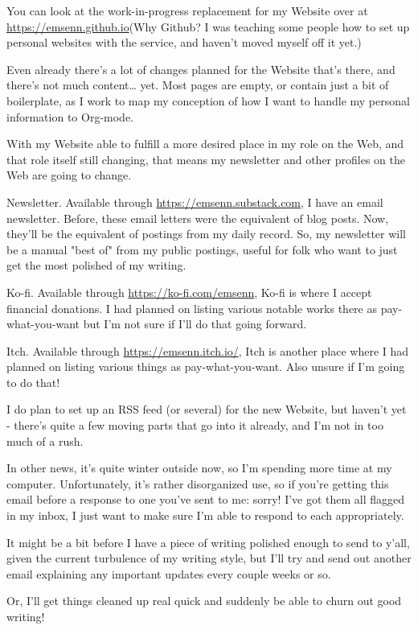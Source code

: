 \documentclass[11pt]{article}
\begin{document}
\begin{itemize}
You can look at the work-in-progress replacement for my Website over at \url{https://emsenn.github.io}(Why Github? I was teaching some people how to set up personal websites with the service, and haven't moved myself off it yet.)

Even already there's a lot of changes planned for the Website that's there, and there's not much content… yet. Most pages are empty, or contain just a bit of boilerplate, as I work to map my conception of how I want to handle my personal information to Org-mode.

With my Website able to fulfill a more desired place in my role on the Web, and that role itself still changing, that means my newsletter and other profiles on the Web are going to change.

Newsletter. Available through \url{https://emsenn.substack.com}, I have an email newsletter. Before, these email letters were the equivalent of blog posts. Now, they'll be the equivalent of postings from my daily record. So, my newsletter will be a manual "best of" from my public postings, useful for folk who want to just get the most polished of my writing.

Ko-fi. Available through \url{https://ko-fi.com/emsenn}, Ko-fi is where I accept financial donations. I had planned on listing various notable works there as pay-what-you-want but I'm not sure if I'll do that going forward.

Itch. Available through \url{https://emsenn.itch.io/}, Itch is another place where I had planned on listing various things as pay-what-you-want. Also unsure if I'm going to do that!

I do plan to set up an RSS feed (or several) for the new Website, but haven't yet - there's quite a few moving parts that go into it already, and I'm not in too much of a rush.

In other news, it's quite winter outside now, so I'm spending more time at my computer. Unfortunately, it's rather disorganized use, so if you're getting this email before a response to one you've sent to me: sorry! I've got them all flagged in my inbox, I just want to make sure I'm able to respond to each appropriately.

It might be a bit before I have a piece of writing polished enough to send to y'all, given the current turbulence of my writing style, but I'll try and send out another email explaining any important updates every couple weeks or so.

Or, I'll get things cleaned up real quick and suddenly be able to churn out good writing!
\end{itemize}
\stopcontents[level-4]
\end{document}
